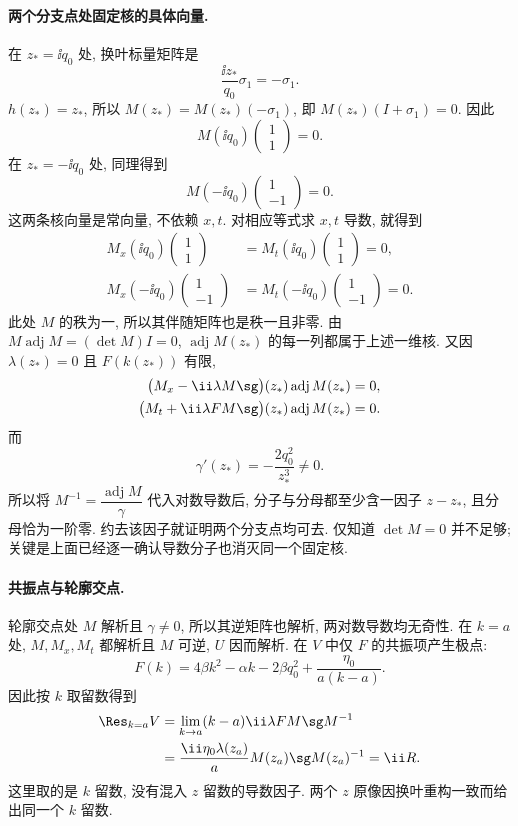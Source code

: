 \paragraph{两个分支点处固定核的具体向量.}
在 $z_* =\ii q_0$ 处, 换叶标量矩阵是
\[
\dfrac{\ii z_*}{q_0}\sigma_1=-\sigma_1.
\]
$h(z_*)=z_*$, 所以 $M(z_*)=M(z_*)(-\sigma_1)$,
即 $M(z_*)(I+\sigma_1)=0$.
因此
\[
M(\ii q_0)\begin{pmatrix}1\\1\end{pmatrix}=0.
\]
在 $z_*=-\ii q_0$ 处, 同理得到
\[
M(-\ii q_0)\begin{pmatrix}1\\-1\end{pmatrix}=0.
\]
这两条核向量是常向量, 不依赖 $x,t$.
对相应等式求 $x,t$ 导数, 就得到
\[
\begin{aligned}
M_x(\ii q_0)\begin{pmatrix}1\\1\end{pmatrix}
&=M_t(\ii q_0)\begin{pmatrix}1\\1\end{pmatrix}=0,\\
M_x(-\ii q_0)\begin{pmatrix}1\\-1\end{pmatrix}
&=M_t(-\ii q_0)\begin{pmatrix}1\\-1\end{pmatrix}=0.
\end{aligned}
\]
此处 $M$ 的秩为一, 所以其伴随矩阵也是秩一且非零.
由 $M\operatorname{adj}M=(\det M)I=0$,
$\operatorname{adj}M(z_*)$ 的每一列都属于上述一维核.
又因 $\lambda(z_*)=0$ 且 $F(k(z_*))$ 有限,
\[
\begin{aligned}
\bigl(M_x-\ii\lambda M\sg\bigr)(z_*)
\operatorname{adj}M(z_*)&=0,\\
\bigl(M_t+\ii\lambda F M\sg\bigr)(z_*)
\operatorname{adj}M(z_*)&=0.
\end{aligned}
\]
而
\[
\gamma'(z_*)=-\dfrac{2q_0^2}{z_*^3}\ne0.
\]
所以将 $M^{-1}=\dfrac{\operatorname{adj}M}{\gamma}$ 代入对数导数后,
分子与分母都至少含一因子 $z-z_*$, 且分母恰为一阶零.
约去该因子就证明两个分支点均可去.
仅知道 $\det M=0$ 并不足够;
关键是上面已经逐一确认导数分子也消灭同一个固定核.

\paragraph{共振点与轮廓交点.}
轮廓交点处 $M$ 解析且 $\gamma\ne0$,
所以其逆矩阵也解析, 两对数导数均无奇性.
在 $k=a$ 处, $M,M_x,M_t$ 都解析且 $M$ 可逆,
$ U$ 因而解析.
在 $ V$ 中仅 $F$ 的共振项产生极点:
\[
F(k)=4\beta k^2-\alpha k-2\beta q_0^2
+\dfrac{\eta_0}{a(k-a)}.
\]
因此按 $k$ 取留数得到
\[
\begin{aligned}
\Res_{k=a} V
&=\lim\limits_{k\to a}(k-a)
\ii\lambda F M\sg M^{-1}\\
&=\dfrac{\ii\eta_0\lambda(z_a)}{a}
M(z_a)\sg M(z_a)^{-1}
=\ii R.
\end{aligned}
\]
这里取的是 $k$ 留数, 没有混入 $z$ 留数的导数因子.
两个 $z$ 原像因换叶重构一致而给出同一个 $k$ 留数.


